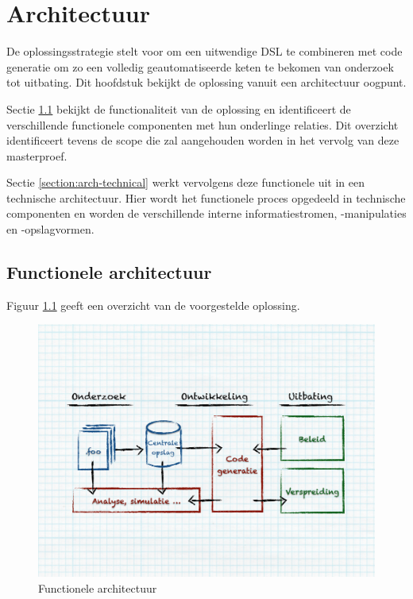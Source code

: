 
\chapter{Architectuur}
\label{chapter:architectuur}

De oplossingsstrategie stelt voor om een uitwendige DSL te combineren met code
generatie om zo een volledig geautomatiseerde keten te bekomen van onderzoek
tot uitbating. Dit hoofdstuk bekijkt de oplossing vanuit een architectuur
oogpunt.

Sectie \ref{section:arch-functional} bekijkt de functionaliteit van de
oplossing en identificeert de verschillende functionele componenten met hun
onderlinge relaties. Dit overzicht identificeert tevens de scope die zal
aangehouden worden in het vervolg van deze masterproef.

Sectie \ref{section:arch-technical} werkt vervolgens deze functionele uit in
een technische architectuur. Hier wordt het functionele proces opgedeeld in
technische componenten en worden de verschillende interne informatiestromen,
-manipulaties en -opslagvormen.

\section{Functionele architectuur}
\label{section:arch-functional}

Figuur \ref{fig:arch-functional} geeft een overzicht van de voorgestelde
oplossing.

\begin{figure}[ht]
  \centering
  \includegraphics[width=0.9\linewidth]{resources/arch-functional.pdf}
  \caption{Functionele architectuur}
  \label{fig:arch-functional}
\end{figure}

